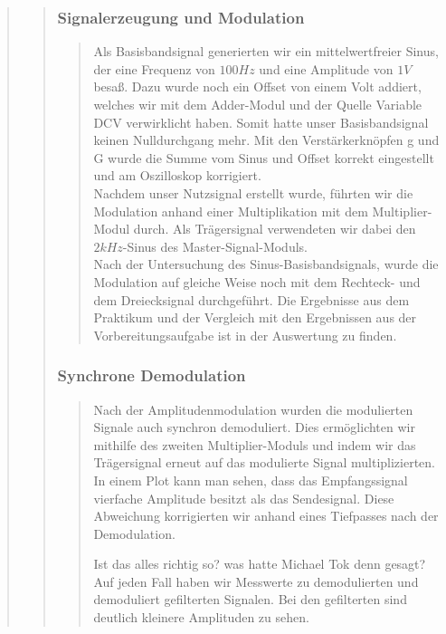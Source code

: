 \begin{quote}
\begin{quote}
    	\subsubsection{Signalerzeugung und Modulation}
    	\begin{quote}
    	Als Basisbandsignal generierten wir ein mittelwertfreier Sinus,
    	der eine Frequenz von $100 Hz$ und eine Amplitude von $1 V$ besaß. Dazu wurde noch
    	ein Offset von einem Volt addiert, welches wir mit dem Adder-Modul und der
    	Quelle Variable DCV verwirklicht haben. Somit hatte unser Basisbandsignal
    	keinen Nulldurchgang mehr. Mit den Verstärkerknöpfen g und G wurde die
    	Summe vom Sinus und Offset korrekt eingestellt und am Oszilloskop
    	korrigiert.\\
    	Nachdem unser Nutzsignal erstellt wurde, führten wir die Modulation anhand
    	einer Multiplikation mit dem Multiplier-Modul durch. Als Trägersignal
    	verwendeten wir dabei den $2kHz$-Sinus des Master-Signal-Moduls.\\
    	Nach der Untersuchung des Sinus-Basisbandsignals, wurde die Modulation auf
    	gleiche Weise noch mit dem Rechteck- und dem Dreiecksignal durchgeführt.
    	Die Ergebnisse aus dem Praktikum und der Vergleich mit den Ergebnissen aus
    	der Vorbereitungsaufgabe ist in der Auswertung zu finden.
    	\end{quote}
    	
    	\vspace{1em}
    	
    	\subsubsection{Synchrone Demodulation}
    	\begin{quote}
    	Nach der Amplitudenmodulation wurden die modulierten Signale auch
    	synchron demoduliert. Dies ermöglichten wir mithilfe des zweiten
    	Multiplier-Moduls und indem wir das Trägersignal erneut auf das modulierte
    	Signal multiplizierten. In einem Plot kann man sehen, dass das
    	Empfangssignal vierfache Amplitude besitzt als das Sendesignal.
    	Diese Abweichung korrigierten wir anhand eines Tiefpasses nach der
    	Demodulation.
    	
    	Ist das alles richtig so? was hatte Michael Tok denn gesagt? Auf jeden Fall
    	haben wir Messwerte zu demodulierten und demoduliert gefilterten Signalen.
    	Bei den gefilterten sind deutlich kleinere Amplituden zu sehen.
		\end{quote}    
    

\end{quote}
\end{quote}
